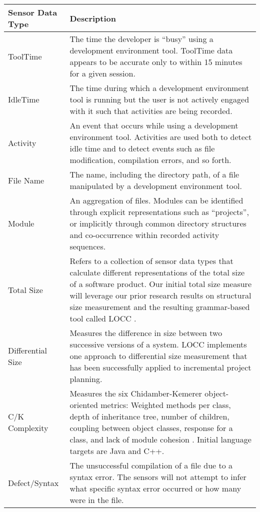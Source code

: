 \begin{figure*}[t]
\begin{small}
\begin{center}
\begin{tabular}{|l|p{5in}|} \hline
{\bf Sensor Data Type} & {\bf Description} \\ \hline
ToolTime 
& The time the developer is ``busy'' using a development
environment tool. ToolTime data appears to be accurate only to within 15 minutes
for a given session.  
\\ \hline
IdleTime
& The time during which a development environment tool is running but the
user is not actively engaged with it such that activities are being
recorded. 
\\ \hline
Activity
& An event that occurs while using a development environment
tool. Activities are used both to detect idle time and to detect events
such as file modification, compilation errors, and so forth.
\\ \hline
File Name
& The name, including the directory path, of a file manipulated by a
development environment tool.
\\ \hline
Module
& An aggregation of files. Modules can be identified through explicit
representations such as ``projects'', or implicitly through common directory
structures and co-occurrence within recorded activity sequences. 
\\ \hline
Total Size
& Refers to a collection of sensor data types
that calculate different representations of the total size of a software product.  Our initial 
total size measure will 
leverage our prior research results on structural size measurement
and the resulting grammar-based tool called LOCC \cite{csdl-99-10}. 
\\ \hline
Differential Size
& Measures the difference in size between two
successive versions of a system. LOCC implements one approach to
differential size measurement that has been successfully applied to
incremental project planning. 
\\ \hline
C/K Complexity
& Measures the six Chidamber-Kemerer object-oriented metrics: Weighted
methods per class, depth of inheritance tree, number of children, coupling
between object classes, response for a class, and lack of module cohesion
\cite{Chidamber94}.
Initial language targets are Java and C++.
\\ \hline
Defect/Syntax
& The unsuccessful compilation of a file due to a syntax error.  The sensors will not 
attempt to infer what specific syntax error occurred
or how many were in the file. 

\end{tabular}
\end{center}
\end{small}
\end{figure*}

